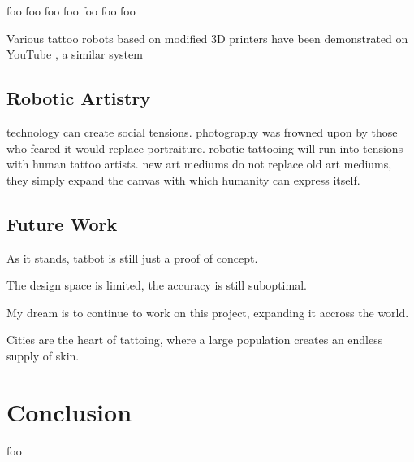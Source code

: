 \documentclass[11pt]{article}
\begin{document}
foo \cite{NietoBastida2023}
foo \cite{arar2025swiftsketch}
foo \cite{carlier2020deepsvg}
foo \cite{mellor2020unsupervised}
foo \cite{ha2017neural}
foo \cite{huang2019learning}
foo \cite{kotani2019teaching}

Various tattoo robots based on modified 3D printers have been demonstrated on YouTube \cite{EmilyTheEngineer2025}, a similar system \cite{YamanDeif2021}

\subsection{Robotic Artistry}

technology can create social tensions.
photography was frowned upon by those who feared it would replace portraiture.
robotic tattooing will run into tensions with human tattoo artists.
new art mediums do not replace old art mediums, they simply expand the canvas with which humanity can express itself.

\subsection{Future Work}

As it stands, tatbot is still just a proof of concept.

The design space is limited, the accuracy is still suboptimal.

My dream is to continue to work on this project, expanding it accross the world.

Cities are the heart of tattoing, where a large population creates an endless supply of skin.

\section{Conclusion}

foo



\end{document}
